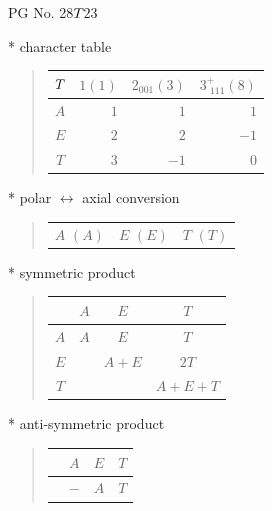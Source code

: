 \documentclass[fleqn,8pt,landscape]{jsarticle}
\begin{document}
\setcounter{MaxMatrixCols}{32}

\renewcommand{\tablename}{Table~}
\renewcommand{\figurename}{Figure~}
\begin{center}
\LARGE
PG No. 28\quad$T_{\rm }$\quad$23$\quad[ cubic ]
\end{center}

* character table
\begin{quote}
\begin{tabular}{crrr} \hline \hline
$ T_{\rm } $ & $ 1(1) $ & $ 2{}_{001}(3) $ & $ 3^{+}_{\,\,111}(8) $ \\ \hline
$ A $ & $ 1 $ & $ 1 $ & $ 1 $ \\
$ E $ & $ 2 $ & $ 2 $ & $ -1 $ \\
$ T $ & $ 3 $ & $ -1 $ & $ 0 $ \\
 \hline \hline
\end{tabular}
\end{quote}

* polar $\leftrightarrow$ axial conversion
\begin{quote}
\begin{tabular}{ccc}
$ A\,\,(A) $ & $ E\,\,(E) $ & $ T\,\,(T) $
\end{tabular}
\end{quote}

* symmetric product
\begin{quote}
\begin{tabular}{c|ccc} \hline \hline
 & $ A $ & $ E $ & $ T $ \\ \hline
$ A $ & $ A $ & $ E $ & $ T $ \\
$ E $ & $  $ & $ A + E $ & $ 2 T $ \\
$ T $ & $  $ & $  $ & $ A + E + T $ \\
 \hline \hline
\end{tabular}
\end{quote}

* anti-symmetric product
\begin{quote}
\begin{tabular}{cccc} \hline \hline
 & $ A $ & $ E $ & $ T $ \\ \hline
$  $ & $ - $ & $ A $ & $ T $ \\
 \hline \hline
\end{tabular}
\end{quote}
\end{document}
